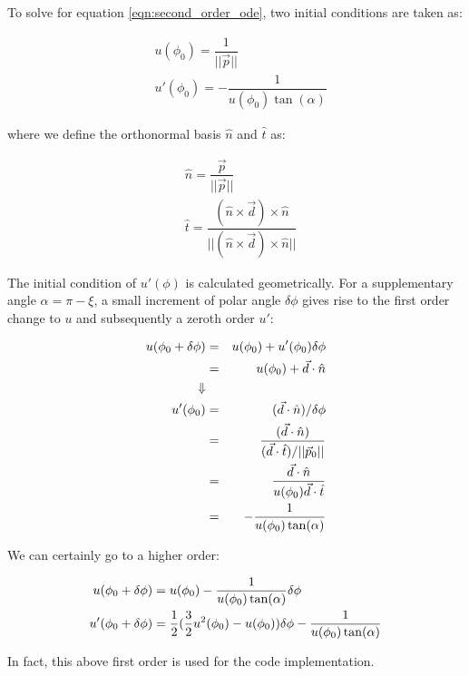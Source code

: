 To solve for equation \ref{eqn:second_order_ode}, two initial conditions are taken as:

\begin{eqnarray}
&u(\phi_0) = \dfrac{1}{||\vec{p}||} \\
&u'(\phi_0) = -\dfrac{1}{u(\phi_0) \tan(\alpha)}
\end{eqnarray}

where we define the orthonormal basis $\hat{n}$ and $\hat{t}$ as:

\begin{eqnarray}
&\hat{n} = \dfrac{\vec{p}}{||\vec{p}||} \\
&\hat{t}= \dfrac{(\hat{n} \times \vec{d}) \times \hat{n}}{||(\hat{n} \times \vec{d}) \times \hat{n}||}
\end{eqnarray}

The initial condition of $u'(\phi)$ is calculated geometrically. For a supplementary angle $\alpha = \pi - \xi$, a small increment of polar angle $\delta \phi$ gives rise to the first order change to $u$ and subsequently a zeroth order $u'$:

\begin{eqnarray}
u(\phi_0+\delta \phi) &=& u(\phi_0) + u'(\phi_0)\delta \phi \notag \\
& = &u(\phi_0) + \vec{d} \cdot \hat{n} \notag \\ 
	\Downarrow \notag \\
u'(\phi_0) &=& (\vec{d} \cdot \hat{n}) /  \delta\phi \notag \\
&=& \dfrac{(\vec{d} \cdot \hat{n})}{(\vec{d} \cdot \hat{t})/||\vec{p}_0||} \notag \\
&=& \dfrac{\vec{d} \cdot \hat{n}}{u(\phi_0) \vec{d} \cdot \hat{t}} \notag \\
&=& - \dfrac{1}{u(\phi_0) \tan(\alpha)}
\end{eqnarray}

We can certainly go to a higher order:

\begin{align}
u(\phi_0+\delta \phi) &= u(\phi_0) - \dfrac{1}{u(\phi_0) \tan(\alpha)} \delta\phi  \\
u'(\phi_0+\delta \phi) &= \frac{1}{2}(\frac{3}{2}u^2(\phi_0)-u(\phi_0))\delta\phi- \dfrac{1}{u(\phi_0) \tan(\alpha)} \notag
\end{align}

In fact, this above first order is used for the code implementation.

